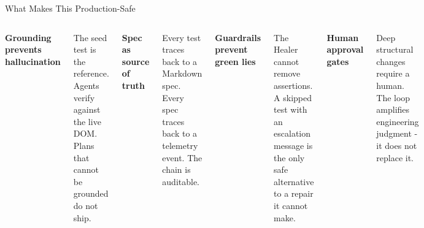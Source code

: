 \documentclass[aspectratio=169,10pt]{beamer}
\begin{document}
\begin{frame}{What Makes This Production-Safe}
  \begin{columns}[T]
      \textbf{Grounding prevents hallucination}

      \vspace{0.4em}
      The seed test is the reference. Agents verify against the live DOM. Plans that cannot be grounded do not ship.

      \vspace{0.8em}
      \textbf{Spec as source of truth}

      \vspace{0.4em}
      Every test traces back to a Markdown spec. Every spec traces back to a telemetry event. The chain is auditable.

      \textbf{Guardrails prevent green lies}

      \vspace{0.4em}
      The Healer cannot remove assertions. A skipped test with an escalation message is the only safe alternative to a repair it cannot make.

      \vspace{0.8em}
      \textbf{Human approval gates}

      \vspace{0.4em}
      Deep structural changes require a human. The loop amplifies engineering judgment - it does not replace it.
  \end{columns}
\end{frame}
\end{document}
